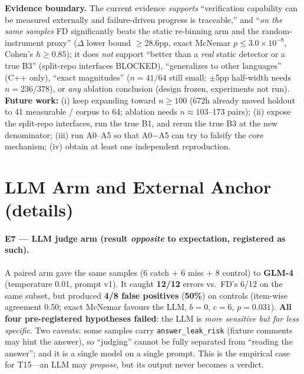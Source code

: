 \documentclass{article}
\begin{document}
\textbf{Evidence boundary.} The current evidence \emph{supports} ``verification capability can be
measured externally and failure-driven progress is traceable,'' and ``\emph{on the same samples}
FD significantly beats the static re-binning arm and the random-instrument proxy'' ($\Delta$
lower bound $\ge$28.6pp, exact McNemar $p\le3.0\times10^{-8}$, Cohen's $h\ge0.85$); it does
\emph{not} support ``better than a \emph{real} static detector or a true B3'' (split-repo
interfaces BLOCKED), ``generalizes to other languages'' (C++ only), ``exact magnitudes''
($n{=}41/64$ still small; $\pm$5pp half-width needs $n{=}236/378$), or \emph{any} ablation
conclusion (design frozen, experiments not run). \textbf{Future work:} (i) keep expanding toward $n\ge100$ (672h already moved holdout to 41
measurable / corpus to 64; ablation needs $n\approx103$--173 pairs); (ii) expose the split-repo
interfaces, run the true B1, and rerun the true B3 at the new denominator; (iii) run A0--A5 so that
A0$-$A5 can try to falsify the core mechanism; (iv) obtain at least one independent reproduction.

\label{page:endmain}%



\newpage
\appendix

\section{LLM Arm and External Anchor (details)}
\label{app:extra}
\paragraph{E7 --- LLM judge arm (result \emph{opposite} to expectation, registered as such).}
A paired arm gave the same samples (6 catch $+$ 6 miss $+$ 8 control) to \textbf{GLM-4}
(temperature 0.01, prompt v1). It caught \textbf{12/12} errors vs.\ FD's 6/12 on the same subset, but
produced \textbf{4/8 false positives} (\textbf{50\%}) on controls (item-wise agreement 0.50; exact
McNemar favours the LLM, $b{=}0$, $c{=}6$, $p{=}0.031$). \textbf{All four pre-registered hypotheses
failed}: the LLM is \emph{more sensitive but far less specific}. Two caveats: some samples carry
\texttt{answer\_leak\_risk} (fixture comments may hint the answer), so ``judging'' cannot be fully
separated from ``reading the answer''; and it is a single model on a single prompt. This is the
empirical case for T15---an LLM may \emph{propose}, but its output never becomes a verdict.
\end{document}
